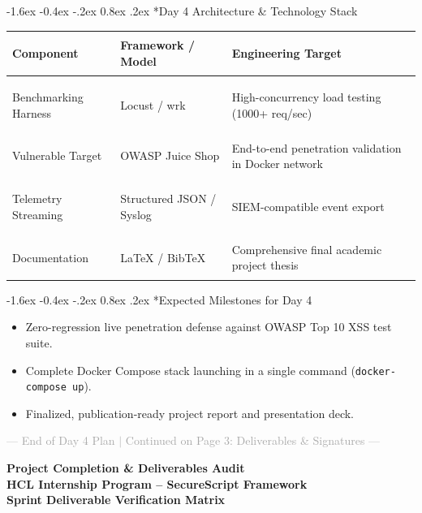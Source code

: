 \documentclass[11pt,a4paper]{article}
\makeatletter
\renewcommand{\section}{\@startsection{section}{1}{\z@}%
  {-1.6ex \@plus -0.4ex \@minus -.2ex}%
  {0.8ex \@plus .2ex}%
  {\normalfont\large\bfseries\color{primaryblue}}}
\makeatother
\begin{document}
\section*{Day 4 Architecture \& Technology Stack}
\begin{table}[htbp]
\centering
\footnotesize
\begin{tabularx}{\textwidth}{>{\bfseries\raggedright\arraybackslash}p{3.0cm} >{\raggedright\arraybackslash}p{3.8cm} >{\raggedright\arraybackslash}X}
\toprule
\textbf{Component} & \textbf{Framework / Model} & \textbf{Engineering Target} \\
\midrule
Benchmarking Harness & Locust / wrk & High-concurrency load testing (1000+ req/sec) \\
Vulnerable Target & OWASP Juice Shop & End-to-end penetration validation in Docker network \\
Telemetry Streaming & Structured JSON / Syslog & SIEM-compatible event export \\
Documentation & LaTeX / BibTeX & Comprehensive final academic project thesis \\
\bottomrule
\end{tabularx}
\end{table}

\section*{Expected Milestones for Day 4}
\begin{itemize}[leftmargin=1.5em, itemsep=2pt]
    \item Zero-regression live penetration defense against OWASP Top 10 XSS test suite.
    \item Complete Docker Compose stack launching in a single command (\texttt{docker-compose up}).
    \item Finalized, publication-ready project report and presentation deck.
\end{itemize}

\vfill
\begin{center}
\footnotesize \textcolor{darkgray}{--- End of Day 4 Plan $\vert$ Continued on Page 3: Deliverables & Signatures ---}
\end{center}

\newpage

\begin{center}
    {\LARGE \textbf{\color{primaryblue} Project Completion \& Deliverables Audit}} \\[0.25em]
    {\large \textbf{HCL Internship Program -- SecureScript Framework}} \\[0.2em]
    {\footnotesize \textbf{Sprint Deliverable Verification Matrix}}
\end{center}
\end{document}
